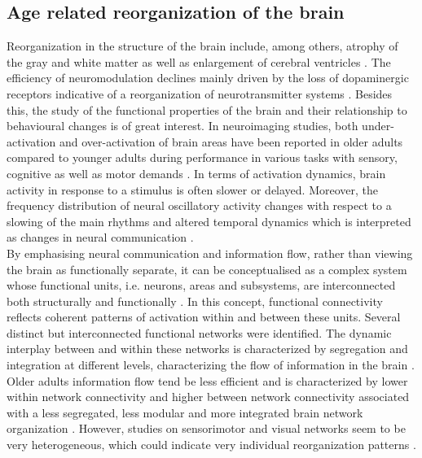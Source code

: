 \subsection{Age related reorganization of the brain}
\label{theory:aging:brain}
Reorganization in the structure of the brain include, among others, atrophy of the gray and white matter as well as enlargement of cerebral ventricles \cite{Fjell2010}. The efficiency of neuromodulation declines mainly driven by the loss of dopaminergic receptors indicative of a reorganization of neurotransmitter systems \cite{Li2001}. Besides this, the study of the functional properties of the brain and their relationship to behavioural changes is of great interest. In neuroimaging studies, both under-activation and over-activation of brain areas have been reported in older adults compared to younger adults during performance in various tasks with sensory, cognitive as well as motor demands \cite{Reuter-Lorenz2010, Sala-Llonch2015}. In terms of activation dynamics, brain activity in response to a stimulus is often slower or delayed. Moreover, the frequency distribution of neural oscillatory activity changes with respect to a slowing of the main rhythms and altered temporal dynamics which is interpreted as changes in neural communication \cite{Courtney2021}.\\ 
By emphasising neural communication and information flow, rather than viewing the brain as functionally separate, it can be conceptualised as a complex system whose functional units, i.e. neurons, areas and subsystems, are interconnected both structurally and functionally \cite{Friston2011,Deery2023}. In this concept, functional connectivity reflects coherent patterns of activation within and between these units. Several distinct but interconnected functional networks were identified. The dynamic interplay between and within these networks is characterized by segregation and integration at different levels, characterizing the flow of information in the brain \cite{Sporns2013}. Older adults information flow tend be less efficient and is characterized by lower within network connectivity and higher between network connectivity associated with a less segregated, less modular and more integrated brain network organization \cite{Sala-Llonch2015,Deery2023, Betzel2014}. However, studies on sensorimotor and visual networks seem to be very heterogeneous, which could indicate very individual reorganization patterns \cite{Deery2023}.

